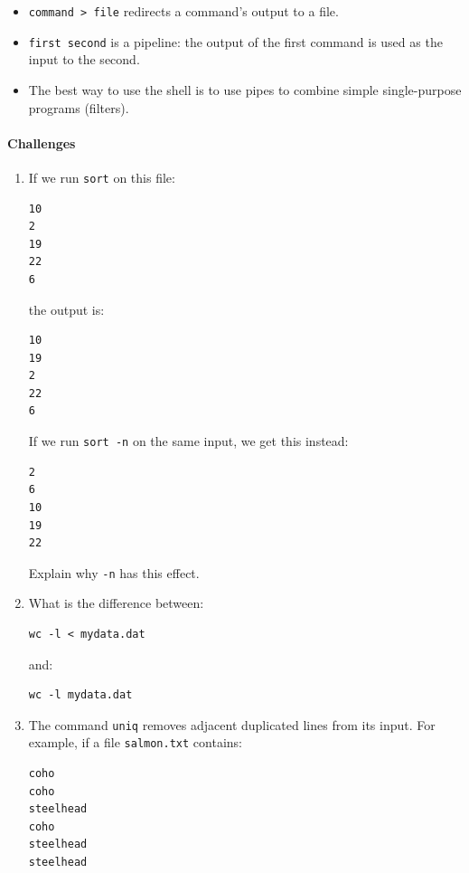 \documentclass[]{book}
\begin{document}
\begin{itemize}
\item
  \texttt{command \textgreater{} file} redirects a command's output to a
  file.
\item
  \texttt{first \textbar{} second} is a pipeline: the output of the
  first command is used as the input to the second.
\item
  The best way to use the shell is to use pipes to combine simple
  single-purpose programs (filters).
\end{itemize}

\mbox{}\paragraph{Challenges}

\begin{enumerate}
\item
  If we run \texttt{sort} on this file:

\begin{verbatim}
10
2
19
22
6
\end{verbatim}

  the output is:

\begin{verbatim}
10
19
2
22
6
\end{verbatim}

  If we run \texttt{sort -n} on the same input, we get this instead:

\begin{verbatim}
2
6
10
19
22
\end{verbatim}

  Explain why \texttt{-n} has this effect.
\item
  What is the difference between:

\begin{verbatim}
wc -l < mydata.dat
\end{verbatim}

  and:

\begin{verbatim}
wc -l mydata.dat
\end{verbatim}
\item
  The command \texttt{uniq} removes adjacent duplicated lines from its
  input. For example, if a file \texttt{salmon.txt} contains:

\begin{verbatim}
coho
coho
steelhead
coho
steelhead
steelhead
\end{verbatim}


\end{enumerate}
\end{document}
